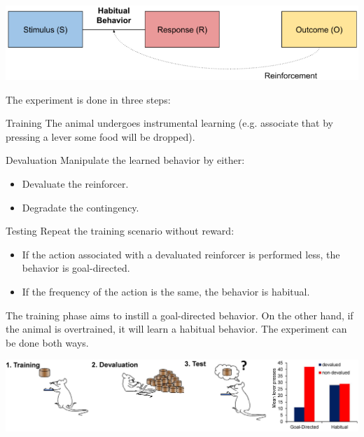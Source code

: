 \begin{descriptionlist}
        \begin{center}
            \includegraphics[width=0.65\linewidth]{./img/habitual_behavior.png}
        \end{center}

\end{descriptionlist} 

\begin{casestudy}
    The experiment is done in three steps:
    \begin{descriptionlist}
        \item[Training] 
            The animal undergoes instrumental learning (e.g. associate that by pressing a lever some food will be dropped).
        
        \item[Devaluation] 
            Manipulate the learned behavior by either:
            \begin{itemize}
                \item Devaluate the reinforcer.
                \item Degradate the contingency.
            \end{itemize}

        \item[Testing] 
            Repeat the training scenario without reward:
            \begin{itemize}
                \item If the action associated with a devaluated reinforcer is performed less, the behavior is goal-directed.
                \item If the frequency of the action is the same, the behavior is habitual.
            \end{itemize}
    \end{descriptionlist}

    \begin{remark}
        The training phase aims to instill a goal-directed behavior.
        On the other hand, if the animal is overtrained, it will learn a habitual behavior.
        The experiment can be done both ways.
    \end{remark}

    \begin{center}
        \includegraphics[width=0.85\linewidth]{./img/goal_directed_vs_habitual.png}
    \end{center}
\end{casestudy}

